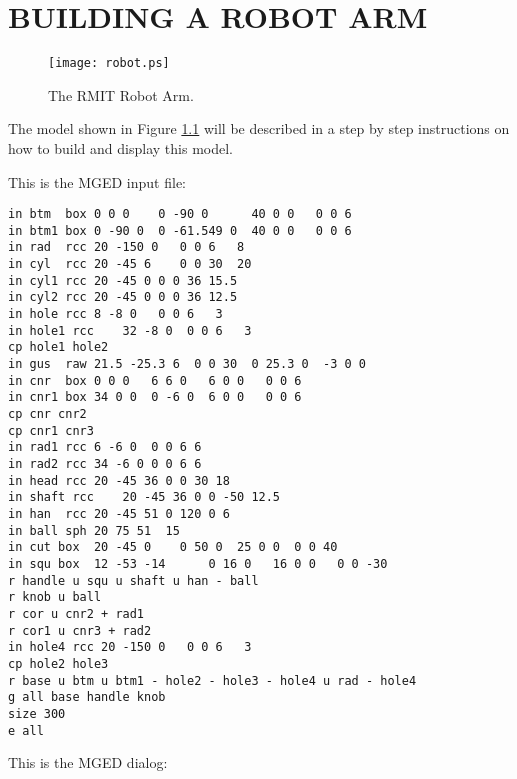 \chapter{BUILDING A ROBOT ARM}

\begin{figure}
\centering \texttt{[image: robot.ps]}
\caption{The RMIT Robot Arm.}
\label{robot}
\end{figure}

The model shown in Figure \ref{robot}
will be described in a step by step instructions
on how to build and display this model.

This is the MGED input file:

\begin{verbatim}
in btm	box	0 0 0    0 -90 0      40 0 0   0 0 6
in btm1	box	0 -90 0  0 -61.549 0  40 0 0   0 0 6
in rad	rcc	20 -150 0   0 0 6   8
in cyl	rcc	20 -45 6    0 0 30  20
in cyl1 rcc	20 -45 0 0 0 36 15.5
in cyl2 rcc	20 -45 0 0 0 36 12.5
in hole rcc	8 -8 0   0 0 6   3
in hole1 rcc	32 -8 0  0 0 6   3
cp hole1 hole2
in gus	raw	21.5 -25.3 6  0 0 30  0 25.3 0  -3 0 0
in cnr	box	0 0 0	6 6 0	6 0 0	0 0 6
in cnr1	box	34 0 0	0 -6 0	6 0 0	0 0 6
cp cnr cnr2
cp cnr1 cnr3
in rad1 rcc	6 -6 0	0 0 6 6
in rad2 rcc	34 -6 0	0 0 6 6
in head rcc	20 -45 36 0 0 30 18
in shaft rcc	20 -45 36 0 0 -50 12.5
in han	rcc	20 -45 51 0 120 0 6
in ball sph	20 75 51  15
in cut box	20 -45 0	0 50 0	25 0 0	0 0 40
in squ box	12 -53 -14  	0 16 0   16 0 0   0 0 -30
r handle u squ u shaft u han - ball
r knob u ball
r cor u cnr2 + rad1
r cor1 u cnr3 + rad2
in hole4 rcc 20 -150 0   0 0 6   3
cp hole2 hole3
r base u btm u btm1 - hole2 - hole3 - hole4 u rad - hole4
g all base handle knob
size 300
e all
\end{verbatim}

This is the MGED dialog:

